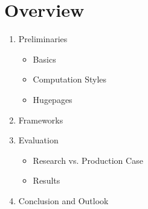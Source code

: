 \documentclass{meetings}
\begin{document}
\section{Overview}
{\large
\begin{enumerate}
	\item Preliminaries
	\begin{itemize}
	\item Basics
	\item Computation Styles
	\item Hugepages
	\end{itemize}
	\item Frameworks
	\item Evaluation
	\begin{itemize}
	\item Research vs. Production Case
	\item Results
	\end{itemize}
	\item Conclusion and Outlook
\end{enumerate}
}





\clearpage
\end{document}

